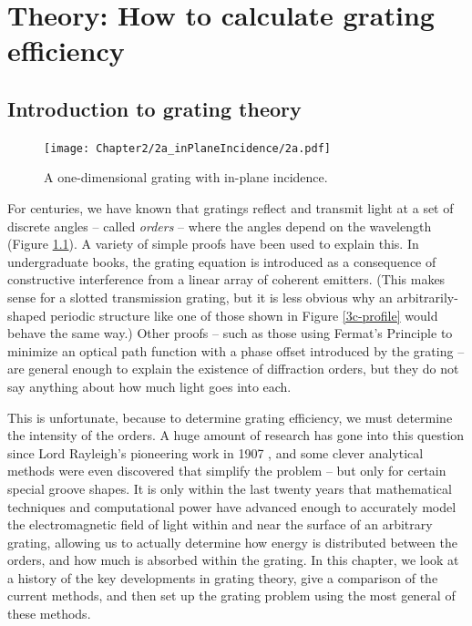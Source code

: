 \chapter{Theory: How to calculate grating efficiency}
\section{Introduction to grating theory}
\begin{figure}[htbp] %
   \centering
   \texttt{[image: Chapter2/2a\_inPlaneIncidence/2a.pdf]} 
   \caption{A one-dimensional grating with in-plane incidence.}
   \label{2a}
\end{figure}

For centuries, we have known that gratings reflect and transmit light at a set of discrete angles -- called \emph{orders} -- where the angles depend on the wavelength  (Figure \ref{2a}).  A variety of simple proofs have been used to explain this.  In undergraduate books, the grating equation is introduced as a consequence of constructive interference from a linear array of coherent emitters. (This makes sense for a slotted transmission grating, but it is less obvious why an arbitrarily-shaped periodic structure like one of those shown in Figure \ref{3c-profile} would behave the same way.)  Other proofs -- such as those using Fermat's Principle to minimize an optical path function with a phase offset introduced by the grating \cite[p.~93 -- 99]{Pea97} -- are general enough to explain the existence of diffraction orders, but they do not say anything about how much light goes into each.

This is unfortunate, because to determine grating efficiency, we must determine the intensity of the orders.  A huge amount of research has gone into this question since Lord Rayleigh's pioneering work in 1907 \cite{Ray07}, and some clever analytical methods were even discovered that simplify the problem -- but only for certain special groove shapes.  It is only within the last twenty years that mathematical techniques and computational power have advanced enough to accurately model the electromagnetic field of light within and near the surface of an arbitrary grating, allowing us to actually determine how energy is distributed between the orders, and how much is absorbed within the grating.  In this chapter, we look at a history of the key developments in grating theory, give a comparison of the current methods, and then set up the grating problem using the most general of these methods.

